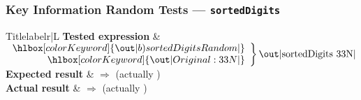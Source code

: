 \subsubsection{Key Information Random Tests --- \texttt{sortedDigits}} %


\begin{tcbtabular}{Title}{label}{r|L}{\normalsize}
		\textbf{Tested expression} &
			$\left.\begin{array}{rr}
				\hlbox[colorKeyword]{\out|b) sortedDigits Random|}\\
				\hlbox[colorKeyword]{\out|Original: 33N|}
			\end{array}\right\}
			\text{\out|sortedDigits 33N|}$\\ \hline
		\textbf{Expected result} &  $\Longrightarrow$  (actually )\\ \hline
		\textbf{Actual result} &  $\Longrightarrow$  (actually )\\ \hline
\end{tcbtabular}


